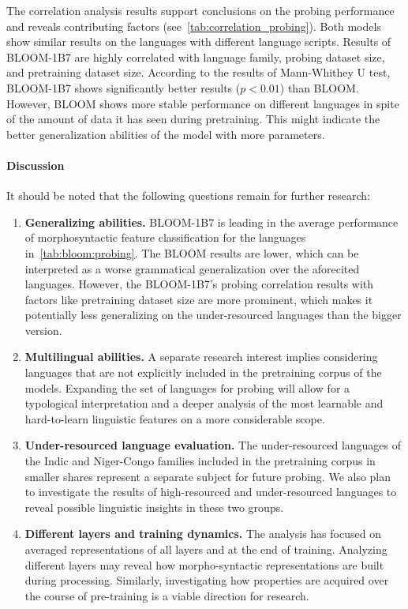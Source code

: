 \documentclass[twoside,11pt]{article}
\begin{document}
The correlation analysis results support conclusions on the probing performance and reveals contributing factors (see~\autoref{tab:correlation_probing}). Both models show similar results on the languages with different language scripts. Results of BLOOM-1B7 are highly correlated with language family, probing dataset size, and pretraining dataset size. According to the results of Mann-Whithey U test, BLOOM-1B7 shows significantly better results ($p < 0.01$) than BLOOM. However, BLOOM shows more stable performance on different languages in spite of the amount of data it has seen during pretraining. This might indicate the better generalization abilities of the model with more parameters. 

\paragraph{Discussion}
It should be noted that the following questions remain for further research:
\begin{enumerate}
    \item \textbf{Generalizing abilities.} BLOOM-1B7 is leading in the average performance of morphosyntactic feature classification for the languages in~\autoref{tab:bloom:probing}. The BLOOM results are lower, which can be interpreted as a worse grammatical generalization over the aforecited languages. However, the BLOOM-1B7's probing correlation results with factors like pretraining dataset size are more prominent, which makes it potentially less generalizing on the under-resourced languages than the bigger version.
    \item \textbf{Multilingual abilities.}
    A separate research interest implies considering languages that are not explicitly included in the pretraining corpus of the models. Expanding the set of languages for probing will allow for a typological interpretation and a deeper analysis of the most learnable and hard-to-learn linguistic features on a more considerable scope.
    \item \textbf{Under-resourced language evaluation.} The under-resourced languages of the Indic and Niger-Congo families included in the pretraining corpus in smaller shares represent a separate subject for future probing. We also plan to investigate the results of high-resourced and under-resourced languages to reveal possible linguistic insights in these two groups.
    \item \textbf{Different layers and training dynamics.} The analysis has focused on averaged representations of all layers and at the end of training. Analyzing different layers may reveal how morpho-syntactic representations are built during processing. Similarly, investigating how properties are acquired over the course of pre-training  \citep{choshen-etal-2022-grammar,zhang-etal-2021-need,voloshina2022neural} is a viable direction for research. 
\end{enumerate}
\end{document}
